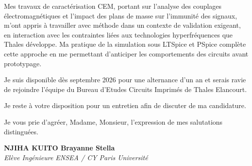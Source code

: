 \documentclass[a4paper,11pt]{article}
\begin{document}
Mes travaux de caractérisation CEM, portant sur l'analyse des couplages électromagnétiques et l'impact des plans de masse sur l'immunité des signaux, m'ont appris à travailler avec méthode dans un contexte de validation exigeant, en interaction avec les contraintes liées aux technologies hyperfréquences que Thales développe. Ma pratique de la simulation sous LTSpice et PSpice complète cette approche en me permettant d'anticiper les comportements des circuits avant prototypage.

Je suis disponible dès septembre 2026 pour une alternance d'un an et serais ravie de rejoindre l'équipe du Bureau d'Etudes Circuits Imprimés de Thales Elancourt.

Je reste à votre disposition pour un entretien afin de discuter de ma candidature.

Je vous prie d'agréer, Madame, Monsieur, l'expression de mes salutations distinguées.

\vspace{0.8cm}

\textbf{NJIHA KUITO Brayanne Stella}\\
\textit{Elève Ingénieure ENSEA / CY Paris Université}
\end{document}
